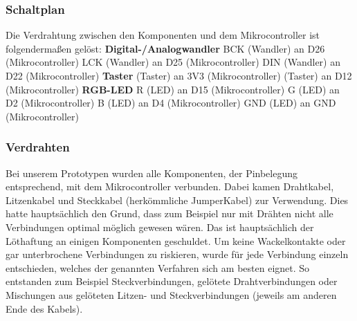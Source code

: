 \documentclass[11pt, twoside]{article}
\begin{document}
\subsubsection{Schaltplan}
Die Verdrahtung zwischen den Komponenten und dem Mikrocontroller ist folgendermaßen gelöst:
\vspace{4mm}\newline
\textbf{Digital-/Analogwandler} \newline
BCK (Wandler) an D26 (Mikrocontroller)\newline
LCK (Wandler) an D25 (Mikrocontroller)\newline
DIN (Wandler) an D22 (Mikrocontroller)\newline
\vspace{4mm}\newline
\textbf{Taster}  (Taster) an 3V3 (Mikrocontroller) (Taster) an D12 (Mikrocontroller)\newline
\vspace{4mm}\newline
\textbf{RGB-LED} \newline
R (LED) an D15 (Mikrocontroller)\newline
G (LED) an D2 (Mikrocontroller)\newline
B (LED) an D4 (Mikrocontroller)\newline
GND (LED) an GND (Mikrocontroller)\newline
\subsubsection{Verdrahten}
Bei unserem Prototypen wurden alle Komponenten, der Pinbelegung entsprechend, mit dem Mikrocontroller verbunden. Dabei kamen Drahtkabel, Litzenkabel und Steckkabel (herkömmliche JumperKabel) zur Verwendung. Dies hatte hauptsächlich den Grund, dass zum Beispiel nur mit Drähten nicht alle Verbindungen optimal möglich gewesen wären. Das ist hauptsächlich der Löthaftung an einigen Komponenten geschuldet. Um keine Wackelkontakte oder gar unterbrochene Verbindungen zu riskieren, wurde für jede Verbindung einzeln entschieden, welches der genannten Verfahren sich am besten eignet. So entstanden zum Beispiel Steckverbindungen, gelötete Drahtverbindungen oder Mischungen aus gelöteten Litzen- und Steckverbindungen (jeweils am anderen Ende des Kabels).
\vspace{-3mm}
\end{document}
